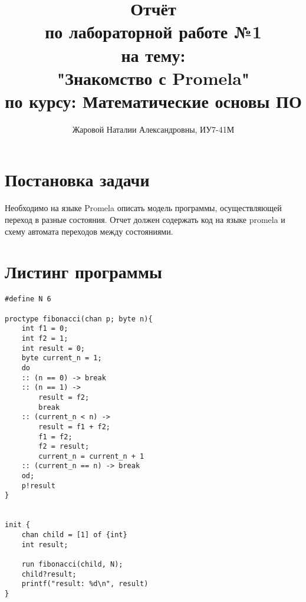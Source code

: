 \documentclass[a4paper,12pt]{report}
\title{Отчёт \\ по лабораторной работе №1 \\ на тему: \\ "Знакомство с Promela" \\ по курсу: Математические основы ПО}
\author{Жаровой Наталии Александровны, ИУ7-41М\\}
\begin{document}
\maketitle

\section*{Постановка задачи}

Необходимо на языке Promela описать модель программы, осуществляющей переход 
в разные состояния. Отчет должен содержать код на языке promela и схему 
автомата переходов между состояниями.

\section*{Листинг программы}
\begin{Verbatim}
#define N 6

proctype fibonacci(chan p; byte n){
    int f1 = 0;
    int f2 = 1;
    int result = 0;
    byte current_n = 1;
    do
    :: (n == 0) -> break
    :: (n == 1) ->
        result = f2;
        break 
    :: (current_n < n) ->
        result = f1 + f2;
        f1 = f2;
        f2 = result;
        current_n = current_n + 1
    :: (current_n == n) -> break
    od;
    p!result
}


init {
    chan child = [1] of {int}
    int result;

    run fibonacci(child, N);
    child?result;
    printf("result: %d\n", result)
}

\end{Verbatim}
\end{document}
